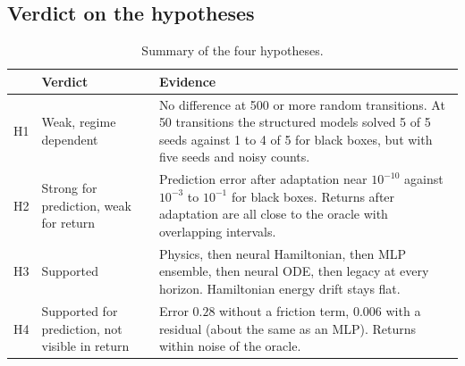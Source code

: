 \documentclass[11pt,a4paper]{article}
\begin{document}
\subsection{Verdict on the hypotheses}
\begin{table}[H]
\centering\small
\begin{tabular}{p{1.2cm}p{3.1cm}p{9.4cm}}
\toprule
 & Verdict & Evidence \\
\midrule
H1 & Weak, regime dependent & No difference at 500 or more random transitions. At 50 transitions the structured models solved 5 of 5 seeds against 1 to 4 of 5 for black boxes, but with five seeds and noisy counts. \\
H2 & Strong for prediction, weak for return & Prediction error after adaptation near $10^{-10}$ against $10^{-3}$ to $10^{-1}$ for black boxes. Returns after adaptation are all close to the oracle with overlapping intervals. \\
H3 & Supported & Physics, then neural Hamiltonian, then MLP ensemble, then neural ODE, then legacy at every horizon. Hamiltonian energy drift stays flat. \\
H4 & Supported for prediction, not visible in return & Error $0.28$ without a friction term, $0.006$ with a residual (about the same as an MLP). Returns within noise of the oracle. \\
\bottomrule
\end{tabular}
\caption{Summary of the four hypotheses.}
\end{table}

\end{document}
